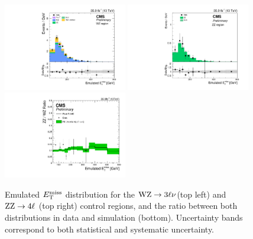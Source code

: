 \begin{figure}[htbp]
\centering
\includegraphics[width=0.48\textwidth]{figures/wz_fakemet_allcuts_postfit.pdf}
\includegraphics[width=0.48\textwidth]{figures/zz_fakemet_allcuts_postfit.pdf}
\includegraphics[width=0.48\textwidth]{figures/ratio_zzvswz.pdf}
\caption{Emulated $E_\mathrm{T}^{\mathrm{miss}}$
distribution for  the $\mathrm{W}\mathrm{Z} \to 3\ell\nu$(top left) and $\mathrm{Z}\mathrm{Z} \to 4\ell$ (top right)
control regions, and the ratio between both distributions in data and simulation (bottom).
 Uncertainty bands correspond to both statistical and systematic uncertainty.}
\label{fig:histo_fakemet}
\end{figure}


